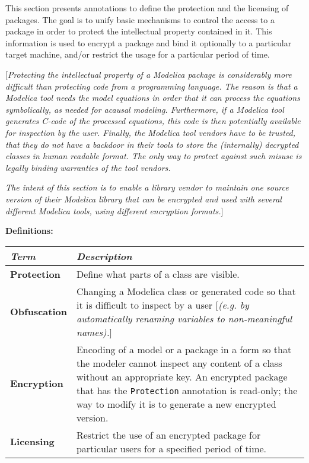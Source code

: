 This section presents annotations to define the protection and the
licensing of packages. The goal is to unify basic mechanisms to control
the access to a package in order to protect the intellectual property
contained in it. This information is used to encrypt a package and bind
it optionally to a particular target machine, and/or restrict the usage
for a particular period of time.

{[}\emph{Protecting the intellectual property of a Modelica package is
considerably more difficult than protecting code from a programming
language. The reason is that a Modelica tool needs the model equations
in order that it can process the equations symbolically, as needed for
acausal modeling. Furthermore, if a Modelica tool generates C-code of
the processed equations, this code is then potentially available for
inspection by the user. Finally, the Modelica tool vendors have to be
trusted, that they do not have a backdoor in their tools to store the
(internally) decrypted classes in human readable format. The only way to
protect against such misuse is legally binding warranties of the tool
vendors. }

\emph{The intent of this section is to enable a library vendor to
maintain one source version of their Modelica library that can be
encrypted and used with several different Modelica tools, using
different encryption formats.}{]}

\textbf{Definitions:}

\begin{longtable}[]{|p{2.5cm}|p{12cm}|}
\hline
\emph{Term} & \emph{Description}\\ \hline
\endhead
\textbf{Protection} & Define what parts of a class are
visible.\\ \hline
\textbf{Obfuscation} & Changing a Modelica class or generated code so
that it is difficult to inspect by a user {[}\emph{(e.g. by
automatically renaming variables to non-meaningful
names).}{]}\\ \hline
\textbf{Encryption} & Encoding of a model or a package in a form so that
the modeler cannot inspect any content of a class without an appropriate
key. An encrypted package that has the \lstinline!Protection! annotation is
read-only; the way to modify it is to generate a new encrypted
version.\\ \hline
\textbf{Licensing} & Restrict the use of an encrypted package for
particular users for a specified period of time.\\ \hline

\end{longtable}

